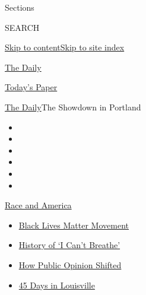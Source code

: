 Sections

SEARCH

\protect\hyperlink{site-content}{Skip to
content}\protect\hyperlink{site-index}{Skip to site index}

\href{https://www.nytimes3xbfgragh.onion/podcasts/the-daily}{The Daily}

\href{https://myaccount.nytimes3xbfgragh.onion/auth/login?response_type=cookie\&client_id=vi}{}

\href{https://www.nytimes3xbfgragh.onion/section/todayspaper}{Today's
Paper}

\href{/podcasts/the-daily}{The Daily}\textbar{}The Showdown in Portland

\begin{itemize}
\item
\item
\item
\item
\item
\item
\end{itemize}

\href{https://www.nytimes3xbfgragh.onion/news-event/george-floyd-protests-minneapolis-new-york-los-angeles?action=click\&pgtype=Article\&state=default\&region=TOP_BANNER\&context=storylines_menu}{Race
and America}

\begin{itemize}
\tightlist
\item
  \href{https://www.nytimes3xbfgragh.onion/interactive/2020/07/03/us/george-floyd-protests-crowd-size.html?action=click\&pgtype=Article\&state=default\&region=TOP_BANNER\&context=storylines_menu}{Black
  Lives Matter Movement}
\item
  \href{https://www.nytimes3xbfgragh.onion/interactive/2020/06/28/us/i-cant-breathe-police-arrest.html?action=click\&pgtype=Article\&state=default\&region=TOP_BANNER\&context=storylines_menu}{History
  of `I Can't Breathe'}
\item
  \href{https://www.nytimes3xbfgragh.onion/interactive/2020/06/10/upshot/black-lives-matter-attitudes.html?action=click\&pgtype=Article\&state=default\&region=TOP_BANNER\&context=storylines_menu}{How
  Public Opinion Shifted}
\item
  \href{https://www.nytimes3xbfgragh.onion/interactive/2020/07/16/us/black-lives-matter-protests-louisville-breonna-taylor.html?action=click\&pgtype=Article\&state=default\&region=TOP_BANNER\&context=storylines_menu}{45
  Days in Louisville}
\end{itemize}

